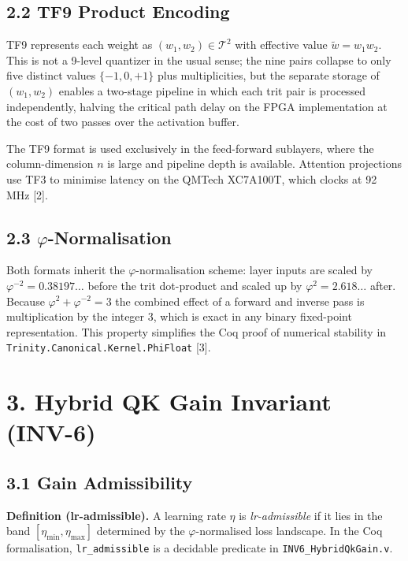 \subsection{2.2 TF9 Product
Encoding}\label{tf9-product-encoding}

TF9 represents each weight as
\((w_1, w_2) \in \mathcal{T}^2\) with effective
value \(\tilde{w} = w_1 w_2\). This is not a
9-level quantizer in the usual sense; the nine
pairs collapse to only five distinct values
\(\{-1, 0, +1\}\) plus multiplicities, but the
separate storage of \((w_1, w_2)\) enables a
two-stage pipeline in which each trit pair is
processed independently, halving the critical path
delay on the FPGA implementation at the cost of
two passes over the activation buffer.

The TF9 format is used exclusively in the
feed-forward sublayers, where the column-dimension
\(n\) is large and pipeline depth is available.
Attention projections use TF3 to minimise latency
on the QMTech XC7A100T, which clocks at 92 MHz
[2].

\subsection{2.3
\texorpdfstring{$\varphi$}{phi}-Normalisation}\label{ux3c6-normalisation}

Both formats inherit the \(\varphi\)-normalisation scheme:
layer inputs are scaled by
\(\varphi^{-2} = 0.38197\ldots\) before the trit
dot-product and scaled up by
\(\varphi^2 = 2.618\ldots\) after. Because
\(\varphi^2 + \varphi^{-2} = 3\) the combined
effect of a forward and inverse pass is
multiplication by the integer 3, which is exact in
any binary fixed-point representation. This
property simplifies the Coq proof of numerical
stability in
\texttt{Trinity.Canonical.Kernel.PhiFloat}
[3].

\section{3. Hybrid QK Gain Invariant
(INV-6)}\label{sec:inv6}\label{hybrid-qk-gain-invariant-inv-6}

\subsection{3.1 Gain
Admissibility}\label{gain-admissibility}

\textbf{Definition (lr-admissible).} A learning
rate \(\eta\) is \emph{lr-admissible} if it lies
in the band \([\eta_{\min}, \eta_{\max}]\)
determined by the \(\varphi\)-normalised loss landscape. In
the Coq formalisation, \texttt{lr\_admissible} is
a decidable predicate in
\texttt{INV6\_HybridQkGain.v}.

